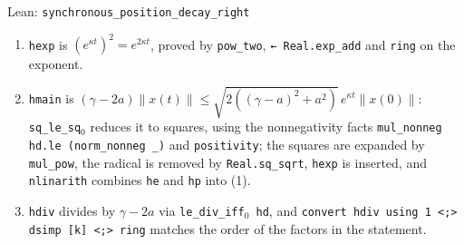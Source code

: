 \documentclass[11pt,a4paper]{article}
\begin{document}
\begin{leanbox}{Lean: \texttt{synchronous\_\allowbreak{}position\_\allowbreak{}decay\_\allowbreak{}right}}
\begin{enumerate}
\item \texttt{hexp} is \((e^{\kappa t})^2=e^{2\kappa t}\), proved by \texttt{pow\_\allowbreak{}two}, \texttt{← Real.\allowbreak{}exp\_\allowbreak{}add} and \texttt{ring} on the exponent.

\item \texttt{hmain} is \((\gamma-2a)\|x(t)\|\le\sqrt{2((\gamma-a)^2+a^2)}\,e^{\kappa t}\|x(0)\|\): \texttt{sq\_\allowbreak{}le\_\allowbreak{}sq\ensuremath{{}_{0}}} reduces it to squares, using the nonnegativity facts \texttt{mul\_\allowbreak{}nonneg hd.\allowbreak{}le (norm\_\allowbreak{}nonneg \_\allowbreak{})} and \texttt{positivity}; the squares are expanded by \texttt{mul\_\allowbreak{}pow}, the radical is removed by \texttt{Real.\allowbreak{}sq\_\allowbreak{}sqrt}, \texttt{hexp} is inserted, and \texttt{nlinarith} combines \texttt{he} and \texttt{hp} into (1).

\item \texttt{hdiv} divides by \(\gamma-2a\) via \texttt{le\_\allowbreak{}div\_\allowbreak{}iff\ensuremath{{}_{0}} hd}, and \texttt{convert hdiv using 1 <;> dsimp [k] <;> ring} matches the order of the factors in the statement.

\end{enumerate}
\end{leanbox}
\end{document}

